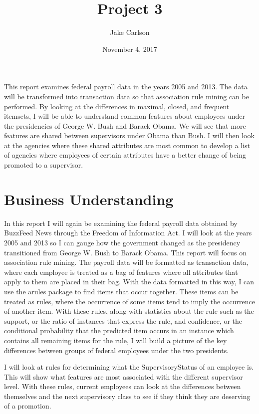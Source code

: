 \documentclass{article}
\begin{document}
\title{Project 3}
\author{Jake Carlson}
\date{November 4, 2017}
\maketitle

\abstract
This report examines federal payroll data in the years 2005 and 2013. The data will be transformed into transaction data so that association rule mining can be performed. By looking at the differences in maximal, closed, and frequent itemsets, I will be able to understand common features about employees under the presidencies of George W. Bush and Barack Obama. We will see that more features are shared between supervisors under Obama than Bush. I will then look at the agencies where these shared attributes are most common to develop a list of agencies where employees of certain attributes have a better change of being promoted to a supervisor.

\newpage

\tableofcontents
\newpage

\section{Business Understanding}
In this report I will again be examining the federal payroll data obtained by BuzzFeed News through the Freedom of Information Act. I will look at the years 2005 and 2013 so I can gauge how the government changed as the presidency transitioned from George W. Bush to Barack Obama. This report will focus on association rule mining. The payroll data will be formatted as transaction data, where each employee is treated as a bag of features where all attributes that apply to them are placed in their bag. With the data formatted in this way, I can use the arules package to find items that occur together. These items can be treated as rules, where the occurrence of some items tend to imply the occurrence of another item. With these rules, along with statistics about the rule such as the support, or the ratio of instances that express the rule, and confidence, or the conditional probability that the predicted item occurs in an instance which contains all remaining items for the rule, I will build a picture of the key differences between groups of federal employees under the two presidents.
\par
I will look at rules for determining what the SupervisoryStatus of an employee is. This will show what features are most associated with the different supervisor level. With these rules, current employees can look at the differences between themselves and the next supervisory class to see if they think they are deserving of a promotion.
\end{document}
